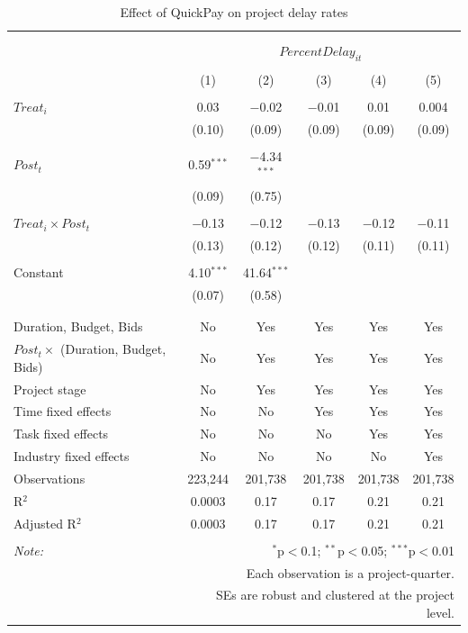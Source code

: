 \documentclass[
]{article}
\begin{document}
\begin{table}[H] \centering 
  \caption{Effect of QuickPay on project delay rates} 
  \label{} 
\small 
\begin{tabular}{@{\extracolsep{-2pt}}lccccc} 
\\[-1.8ex]\hline 
\hline \\[-1.8ex] 
\\[-1.8ex] & \multicolumn{5}{c}{$PercentDelay_{it}$} \\ 
\\[-1.8ex] & (1) & (2) & (3) & (4) & (5)\\ 
\hline \\[-1.8ex] 
 $Treat_i$ & 0.03 & $-$0.02 & $-$0.01 & 0.01 & 0.004 \\ 
  & (0.10) & (0.09) & (0.09) & (0.09) & (0.09) \\ 
  & & & & & \\ 
 $Post_t$ & 0.59$^{***}$ & $-$4.34$^{***}$ &  &  &  \\ 
  & (0.09) & (0.75) &  &  &  \\ 
  & & & & & \\ 
 $Treat_i \times Post_t$ & $-$0.13 & $-$0.12 & $-$0.13 & $-$0.12 & $-$0.11 \\ 
  & (0.13) & (0.12) & (0.12) & (0.11) & (0.11) \\ 
  & & & & & \\ 
 Constant & 4.10$^{***}$ & 41.64$^{***}$ &  &  &  \\ 
  & (0.07) & (0.58) &  &  &  \\ 
  & & & & & \\ 
\hline \\[-1.8ex] 
Duration, Budget, Bids & No & Yes & Yes & Yes & Yes \\ 
$Post_t \times$  (Duration, Budget, Bids) & No & Yes & Yes & Yes & Yes \\ 
Project stage & No & Yes & Yes & Yes & Yes \\ 
Time fixed effects & No & No & Yes & Yes & Yes \\ 
Task fixed effects & No & No & No & Yes & Yes \\ 
Industry fixed effects & No & No & No & No & Yes \\ 
Observations & 223,244 & 201,738 & 201,738 & 201,738 & 201,738 \\ 
R$^{2}$ & 0.0003 & 0.17 & 0.17 & 0.21 & 0.21 \\ 
Adjusted R$^{2}$ & 0.0003 & 0.17 & 0.17 & 0.21 & 0.21 \\ 
\hline 
\hline \\[-1.8ex] 
\textit{Note:}  & \multicolumn{5}{r}{$^{*}$p$<$0.1; $^{**}$p$<$0.05; $^{***}$p$<$0.01} \\ 
 & \multicolumn{5}{r}{Each observation is a project-quarter.} \\ 
 & \multicolumn{5}{r}{SEs are robust and clustered at the project level.} \\ 
\end{tabular} 
\end{table}
\end{document}
